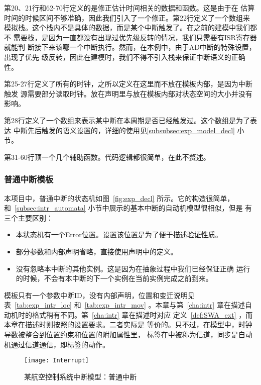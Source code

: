 第20、21行和62-70行定义的是修正估计时间相关的数据和函数。这是由于\uppaal 在
估算时间的时候区间不够准确，因此我们引入了一个修正。第22行定义了一个数组来
模拟栈。这个栈内不是具体的数据，而是某个中断触发了。在之前的建模中我们都不
需要栈，是因为一直都没有出现过优先级反转的情况，我们只需要有ISR寄存器就能判
断接下来该哪一个中断执行。然而，在本例中，由于AD中断的特殊设置，出现了优先
级反转，因此在建模时，我们不得不引入栈来保证中断语义的正确性。

第25-27行定义了所有的时钟，之所以定义在这里而不放在模板内部，是因为中断触发
源需要部分读取时钟。放在声明里与放在模板内部对状态空间的大小并没有影响。

第28行定义了一个数组来表示某中断在本周期是否已经触发过。这个数组是为了表达
中断先后触发的语义设置的，详细的使用见\ref{subsubsec:exp_model_decl} 小节。

第31-60行顶一个几个辅助函数。代码逻辑都很简单，在此不赘述。

\subsubsection{普通中断模板}
\label{subsubsec:exp_intr}

本项目中，普通中断的状态机如图~\ref{fig:exp_decl} 所示。它的构造很简单，
和~\ref{subsec:intr_automata} 小节中展示的基本中断的自动机模型很相似，但是
有三个主要区别：

\begin{itemize}
	\item 本状态机有一个Error位置。设置该位置是为了便于描述验证性质。
	\item 部分参数和内部声明省略，直接使用声明中的定义。
	\item 没有忽略本中断的其他实例。这是因为在抽象过程中我们已经保证正确
	运行的时候，不会有本中断的下一个实例在当前实例完成之前到来。
\end{itemize}

模板只有一个参数\pozhehao 中断ID，没有内部声明，位置和变迁说明见
表~\ref{tab:exp_intr_loc} 和~\ref{tab:exp_intr_mov} 。本章与第~\ref{cha:intr}
章在描述自动机时的格式稍有不同。第~\ref{cha:intr} 章在描述时对应
定义~\ref{def:SWA_ext} ，而本章在描述时则按照\uppaal 的设置要求。二者实际是
等价的。只不过，在\uppaal 模型中，时钟导数被整合到位置约束和位置的附加属性里，
标签在\uppaal 中被称为信道，同步是自动机通过信道通信，即标签的动作。

\begin{figure}[H]
	\centering
	\texttt{[image: Interrupt]}
	\caption{某航空控制系统中断模型：普通中断}
	\label{fig:exp_intr}
\end{figure}

